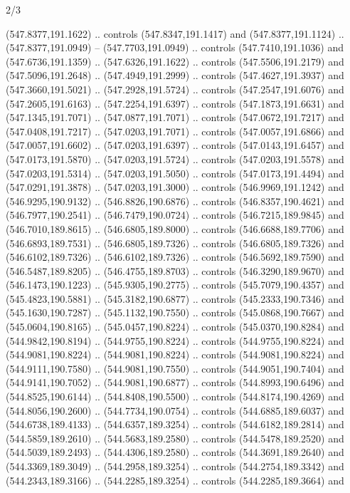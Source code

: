 \begin{flagdescription}{2/3}
\begin{scope}[xshift=0.5\flaglength,yshift=0.5\flagwidth,scale=\flagwidth/495.65]
\begin{scope}[y=0.8pt, x=0.8pt, yscale=-1,shift={(-463.76,-309.78)}]
  (547.8377,191.1622) .. controls (547.8347,191.1417) and (547.8377,191.1124) ..
  (547.8377,191.0949) -- (547.7703,191.0949) .. controls (547.7410,191.1036) and
  (547.6736,191.1359) .. (547.6326,191.1622) .. controls (547.5506,191.2179) and
  (547.5096,191.2648) .. (547.4949,191.2999) .. controls (547.4627,191.3937) and
  (547.3660,191.5021) .. (547.2928,191.5724) .. controls (547.2547,191.6076) and
  (547.2605,191.6163) .. (547.2254,191.6397) .. controls (547.1873,191.6631) and
  (547.1345,191.7071) .. (547.0877,191.7071) .. controls (547.0672,191.7217) and
  (547.0408,191.7217) .. (547.0203,191.7071) .. controls (547.0057,191.6866) and
  (547.0057,191.6602) .. (547.0203,191.6397) .. controls (547.0143,191.6457) and
  (547.0173,191.5870) .. (547.0203,191.5724) .. controls (547.0203,191.5578) and
  (547.0203,191.5314) .. (547.0203,191.5050) .. controls (547.0173,191.4494) and
  (547.0291,191.3878) .. (547.0203,191.3000) .. controls (546.9969,191.1242) and
  (546.9295,190.9132) .. (546.8826,190.6876) .. controls (546.8357,190.4621) and
  (546.7977,190.2541) .. (546.7479,190.0724) .. controls (546.7215,189.9845) and
  (546.7010,189.8615) .. (546.6805,189.8000) .. controls (546.6688,189.7706) and
  (546.6893,189.7531) .. (546.6805,189.7326) .. controls (546.6805,189.7326) and
  (546.6102,189.7326) .. (546.6102,189.7326) .. controls (546.5692,189.7590) and
  (546.5487,189.8205) .. (546.4755,189.8703) .. controls (546.3290,189.9670) and
  (546.1473,190.1223) .. (545.9305,190.2775) .. controls (545.7079,190.4357) and
  (545.4823,190.5881) .. (545.3182,190.6877) .. controls (545.2333,190.7346) and
  (545.1630,190.7287) .. (545.1132,190.7550) .. controls (545.0868,190.7667) and
  (545.0604,190.8165) .. (545.0457,190.8224) .. controls (545.0370,190.8284) and
  (544.9842,190.8194) .. (544.9755,190.8224) .. controls (544.9755,190.8224) and
  (544.9081,190.8224) .. (544.9081,190.8224) .. controls (544.9081,190.8224) and
  (544.9111,190.7580) .. (544.9081,190.7550) .. controls (544.9051,190.7404) and
  (544.9141,190.7052) .. (544.9081,190.6877) .. controls (544.8993,190.6496) and
  (544.8525,190.6144) .. (544.8408,190.5500) .. controls (544.8174,190.4269) and
  (544.8056,190.2600) .. (544.7734,190.0754) .. controls (544.6885,189.6037) and
  (544.6738,189.4133) .. (544.6357,189.3254) .. controls (544.6182,189.2814) and
  (544.5859,189.2610) .. (544.5683,189.2580) .. controls (544.5478,189.2520) and
  (544.5039,189.2493) .. (544.4306,189.2580) .. controls (544.3691,189.2640) and
  (544.3369,189.3049) .. (544.2958,189.3254) .. controls (544.2754,189.3342) and
  (544.2343,189.3166) .. (544.2285,189.3254) .. controls (544.2285,189.3664) and

\end{scope}
\end{scope}
\end{flagdescription}

